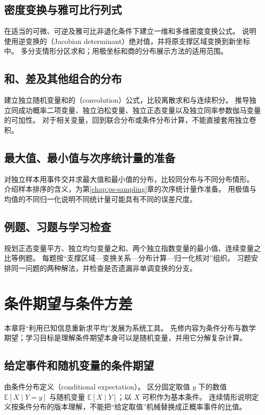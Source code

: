 \documentclass[UTF8,12pt,a4paper,fontset=fandol]{ctexbook}
\begin{document}
\section{密度变换与雅可比行列式}
\label{sec:ps-jacobian}
在适当的可微、可逆及雅可比非退化条件下建立一维和多维密度变换公式。
说明使用逆变换的（Jacobian determinant）绝对值，并将原支撑区域变换到新坐标中。
多分支情形分区求和；用极坐标和商的分布展示方法的适用范围。

\section{和、差及其他组合的分布}
\label{sec:ps-convolution}
建立独立随机变量和的（convolution）公式，比较离散求和与连续积分。
推导独立同成功概率二项变量、独立泊松变量、独立正态变量以及独立同率参数伽马变量的可加性。
对于相关变量，回到联合分布或条件分布计算，不能直接套用独立卷积。

\section{最大值、最小值与次序统计量的准备}
\label{sec:ps-extreme-transform}
对独立样本用事件交并求最大值和最小值的分布，比较同分布与不同分布情形。
介绍样本排序的含义，为第\ref{chap:ps-sampling}章的次序统计量作准备。
用极值与均值的不同归一化说明不同统计量可能具有不同的误差尺度。

\section{例题、习题与学习检查}
规划正态变量平方、独立均匀变量之和、两个独立指数变量的最小值、连续变量之比等例题。
每题按“支撑区域---变换关系---分布计算---归一化核对”组织。
习题安排同一问题的两种解法，并检查是否遗漏非单调变换的分支。


\chapter{条件期望与条件方差}
\label{chap:ps-conditional-expectation}

本章将“利用已知信息重新求平均”发展为系统工具。
先修内容为条件分布与数学期望；学习目标是理解条件期望本身可以是随机变量，并用它分解复杂计算。

\section{给定事件和随机变量的条件期望}
\label{sec:ps-conditional-expectation-definition}
由条件分布定义（conditional expectation）。
区分固定取值 $y$ 下的数值 $\mathbb E[X\mid Y=y]$ 与随机变量 $\mathbb E[X\mid Y]$；以 $X$ 可积作为基本条件。
连续情形说明定义按条件分布的版本理解，不能把“给定取值”机械替换成正概率事件的比值。
\end{document}
